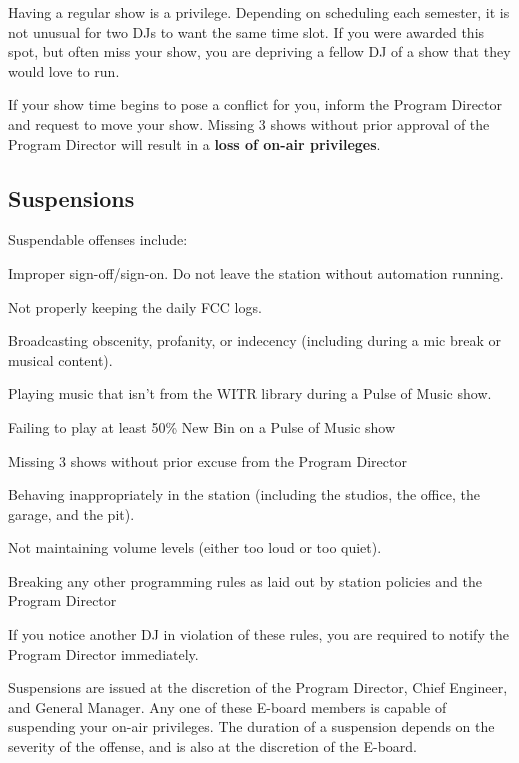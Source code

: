 \documentclass{witrman}
\begin{document}
Having a regular show is a privilege.  Depending on scheduling each semester, it
is not unusual for two DJs to want the same time slot.  If you were awarded this
spot, but often miss your show, you are depriving a fellow DJ of a show that
they would love to run.

If your show time begins to pose a conflict for you, inform the Program Director
and request to move your show.  Missing 3 shows without prior approval of the
Program Director will result in a \textbf{loss of on-air privileges}.


\subsection{Suspensions}

Suspendable offenses include:

\begin{skinnyitemize}
    \item Improper sign-off/sign-on.  Do not leave the station without
        automation running.
    \item Not properly keeping the daily FCC logs.
    \item Broadcasting obscenity, profanity, or indecency (including during a
        mic break or musical content).
    \item Playing music that isn't from the WITR library during a Pulse of Music
        show.
    \item Failing to play at least 50\% New Bin on a Pulse of Music show
    \item Missing 3 shows without prior excuse from the Program Director
    \item Behaving inappropriately in the station (including the studios, the
        office, the garage, and the pit).
    \item Not maintaining volume levels (either too loud or too quiet).
    \item Breaking any other programming rules as laid out by station policies
        and the Program Director
\end{skinnyitemize}

If you notice another DJ in violation of these rules, you are required to notify
the Program Director immediately.

Suspensions are issued at the discretion of the Program Director, Chief
Engineer, and General Manager.  Any one of these E-board members is capable of
suspending your on-air privileges.  The duration of a suspension depends on the
severity of the offense, and is also at the discretion of the E-board.
\end{document}
